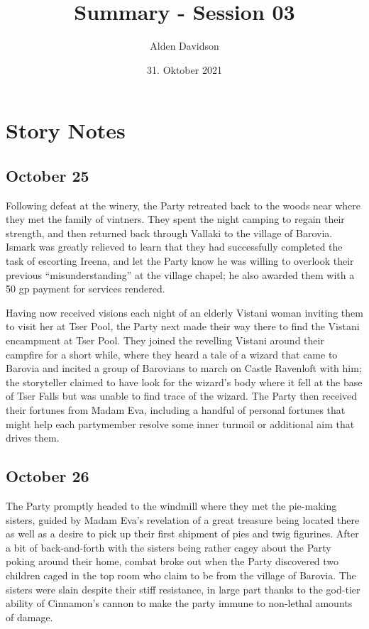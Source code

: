 \documentclass[a4paper,11pt]{article}
\title{Summary - Session 03}
\author{Alden Davidson}
\date{31. Oktober 2021}
\begin{document}
\maketitle

\section{Story Notes}
\subsection{October 25}
Following defeat at the winery, the Party retreated back to the woods near where they met the family of vintners.
They spent the night camping to regain their strength, and then returned back through Vallaki to the village of 
Barovia. Ismark was greatly relieved to learn that they had successfully completed the task of escorting Ireena,
and let the Party know he was willing to overlook their previous ``misunderstanding'' at the village chapel; he 
also awarded them with a 50 gp payment for services rendered.

Having now received visions each night of an elderly Vistani woman inviting them to visit her at Tser Pool, the 
Party next made their way there to find the Vistani encampment at Tser Pool. They joined the revelling Vistani
around their campfire for a short while, where they heard a tale of a wizard that came to Barovia and incited a
group of Barovians to march on Castle Ravenloft with him; the storyteller claimed to have look for the wizard's 
body where it fell at the base of Tser Falls but was unable to find trace of the wizard. The Party then received 
their fortunes from Madam Eva, including a handful of personal fortunes that might help each partymember resolve 
some inner turmoil or additional aim that drives them.

\subsection{October 26}
The Party promptly headed to the windmill where they met the pie-making sisters, guided by Madam Eva's revelation 
of a great treasure being located there as well as a desire to pick up their first shipment of pies and twig 
figurines. After a bit of back-and-forth with the sisters being rather cagey about the Party poking around their 
home, combat broke out when the Party discovered two children caged in the top room who claim to be from the 
village of Barovia. The sisters were slain despite their stiff resistance, in large part thanks to the god-tier 
ability of Cinnamon's cannon to make the party immune to non-lethal amounts of damage.
\end{document}
